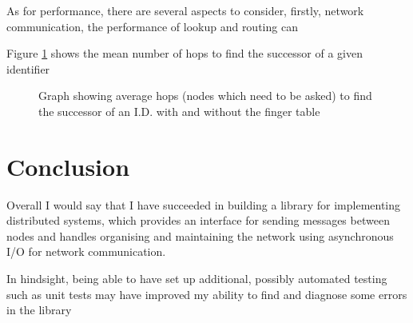 \documentclass{article}
\begin{document}
As for performance, there are several aspects to consider, firstly, network communication, the performance of lookup and routing can 

Figure \ref{fig:fingerperf} shows the mean number of hops to find the successor of a given identifier

\begin{figure}
\begin{center}
\end{center}
\caption{Graph showing average hops (nodes which need to be asked) to find the successor of an I.D. with and without the finger table}
\label{fig:fingerperf}
\end{figure}




\section{Conclusion}

Overall I would say that I have succeeded in building a library for implementing distributed systems, which provides an interface for sending messages between nodes and handles organising and maintaining the network using asynchronous I/O for network communication.

In hindsight, being able to have set up additional, possibly automated testing such as unit tests may have improved my ability to find and diagnose some errors in the library
\end{document}
